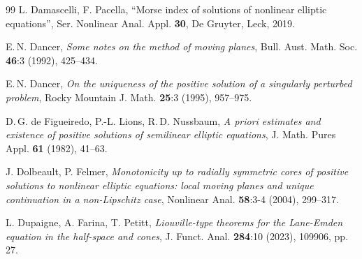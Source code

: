 \documentclass[12pt]{amsart}
\numberwithin{equation}{section}
\theoremstyle{plain}
\theoremstyle{plain}
\theoremstyle{plain}
\theoremstyle{definition}
\begin{document}
\begin{thebibliography}{99}
L. Damascelli, F. Pacella,
``Morse index of solutions of nonlinear elliptic equations'',
Ser. Nonlinear Anal. Appl. \textbf{30}, De Gruyter, Leck, 2019.

E.$\,$N. Dancer, 
\emph{Some notes on the method of moving planes},
Bull. Aust. Math. Soc. \textbf{46}:3 (1992), 425--434.


E.$\,$N. Dancer,
\emph{On the uniqueness of the positive solution of a singularly perturbed problem},
Rocky Mountain J. Math. \textbf{25}:3 (1995), 957--975.


D.$\,$G. de Figueiredo, P.-L. Lions, R.$\,$D. Nussbaum,
\emph{A priori estimates and existence of positive solutions of semilinear elliptic equations},
J. Math. Pures Appl. \textbf{61} (1982), 41--63.%



J. Dolbeault, P. Felmer,
\emph{Monotonicity up to radially symmetric cores of positive solutions to nonlinear elliptic equations: local moving planes and unique continuation in a non-Lipschitz case},
Nonlinear Anal. \textbf{58}:3-4 (2004), 299--317.


L. Dupaigne, A. Farina, T. Petitt,
\emph{Liouville-type theorems for the Lane-Emden equation in the half-space and cones},
J. Funct. Anal. \textbf{284}:10 (2023), 109906, pp. 27.


\end{thebibliography}
\end{document}

